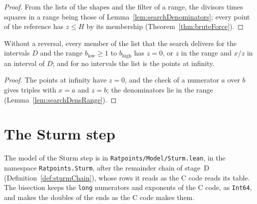 \begin{proof}
  \leanok
  From the lists of the shapes and the filter of a range, the divisors times squares in a range
  being those of Lemma~\ref{lem:searchDenominators}; every point of the reference has $z \le H$ by
  its membership (Theorem~\ref{thm:bruteForce}).
\end{proof}

\begin{lemma}\label{lem:searchListRegion}
  \leanok
  Without a reversal, every member of the list that the search delivers for the intervals $D$ and
  the range $b_{\mathrm{low}} \ge 1$ to $b_{\mathrm{high}}$ has $z = 0$, or $z$ in the range and
  $x/z$ in an interval of $D$; and for no intervals the list is the points at infinity.
\end{lemma}

\begin{proof}
  \leanok
  The points at infinity have $z = 0$, and the check of a numerator $a$ over $b$ gives triples with
  $x = a$ and $z = b$; the denominators lie in the range (Lemma~\ref{lem:searchDensRange}).
\end{proof}

\section{The Sturm step}\label{sec:sturmStep}

The model of the Sturm step is in \verb|Ratpoints/Model/Sturm.lean|, in the namespace
\verb|Ratpoints.Sturm|, after the remainder chain of stage~D (Definition~\ref{def:sturmChain}),
whose rows it reads as the C code reads its table. The bisection keeps the \verb|long| numerators
and exponents of the C code, as \verb|Int64|, and makes the doubles of the ends as the C code makes
them.

